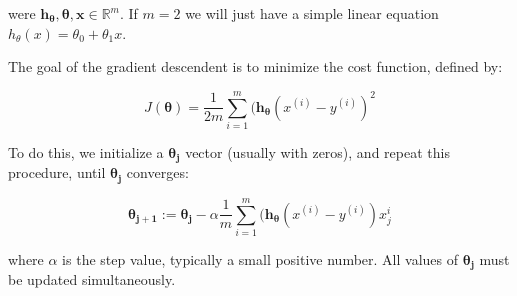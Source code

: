 were $\boldsymbol{h_{\theta}}, \boldsymbol{\theta}, \boldsymbol{x} \in \mathbb{R}^{m}$. If $m = 2$ we will just have a simple linear equation $h_{\theta}(x) = \theta_{0} + \theta_{1}x$.

The goal of the gradient descendent is to minimize the cost function, defined by:

\begin{equation}
	J(\boldsymbol{\theta}) = \frac{1}{2m} \sum_{i = 1}^{m}  ( \boldsymbol{h_{\theta}}(x^{(i)} - y^{(i)} )^{2}
\end{equation}


To do this, we initialize a $\boldsymbol{\theta_{j}}$ vector (usually with zeros), and repeat this procedure, until $\boldsymbol{\theta_{j}}$ converges:

\begin{equation}
	\boldsymbol{\theta_{j + 1}} := \boldsymbol{\theta_{j}} - \alpha \frac{1}{m} \sum_{i = 1}^{m}  ( \boldsymbol{h_{\theta}}(x^{(i)} - y^{(i)} )x_{j}^{i}
\end{equation}

where $\alpha$ is the step value, typically a small positive number. All values of $\boldsymbol{\theta_{j}}$ must be updated simultaneously. 

